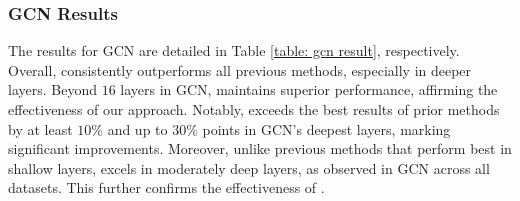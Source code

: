 









\subsubsection{GCN Results}

The results for GCN are detailed in Table \ref{table: gcn result}, respectively. 
Overall, \ours consistently outperforms all previous methods, especially in deeper layers. 
Beyond $16$ layers in GCN, \ours maintains superior performance, affirming the effectiveness of our approach. 
Notably, \ours exceeds the best results of prior methods by at least $10\%$ and up to $30\%$ points in GCN's deepest layers, marking significant improvements.
Moreover, unlike previous methods that perform best in shallow layers, \ours excels in moderately deep layers, as observed in GCN across all datasets. 
This further confirms the effectiveness of \ours.


